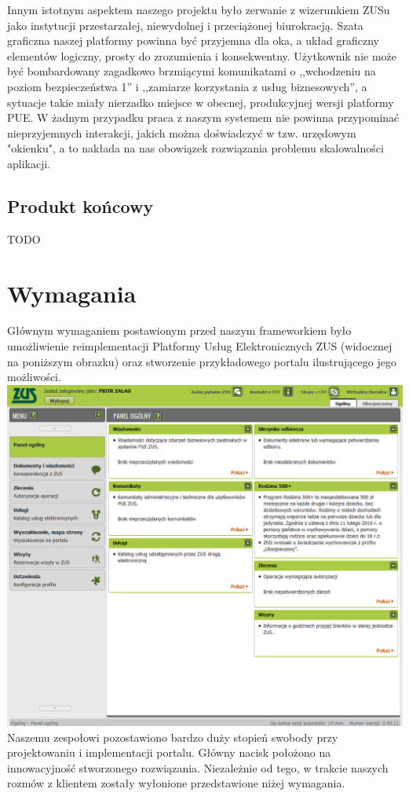 \documentclass[licencjacka]{pracamgr}
\begin{document}
Innym istotnym aspektem naszego projektu było zerwanie z wizerunkiem ZUSu jako
instytucji przestarzałej, niewydolnej i przeciążonej biurokracją. Szata graficzna naszej platformy powinna być przyjemna dla oka, a układ
graficzny elementów logiczny, prosty do zrozumienia i konsekwentny. Użytkownik
nie może być bombardowany zagadkowo brzmiącymi komunikatami o ,,wchodzeniu na
poziom bezpieczeństwa 1'' i ,,zamiarze korzystania z usług biznesowych'', a sytuacje takie miały nierzadko miejsce w obecnej, produkcyjnej wersji platformy PUE. 
W żadnym przypadku praca z naszym systemem nie powinna przypominać nieprzyjemnych interakcji, jakich można doświadczyć w tzw. urzędowym "okienku", a to
nakłada na nas obowiązek rozwiązania problemu skalowalności aplikacji.

\section{Produkt końcowy}
TODO %

\chapter{Wymagania}

Głównym wymaganiem postawionym przed naszym frameworkiem było umożliwienie reimplementacji
Platformy Usług Elektronicznych ZUS (widocznej na poniższym obrazku) oraz stworzenie
przykładowego portalu ilustrującego jego możliwości.\\
\includegraphics[width=\textwidth]{obrazki/pue2.png}
Naszemu zespołowi pozostawiono bardzo duży stopień swobody przy projektowaniu i
implementacji portalu. Główny nacisk położono na innowacyjność stworzonego rozwiązania.
Niezależnie od tego, w trakcie naszych rozmów z klientem zostały wyłonione przedstawione
niżej wymagania.
\end{document}
